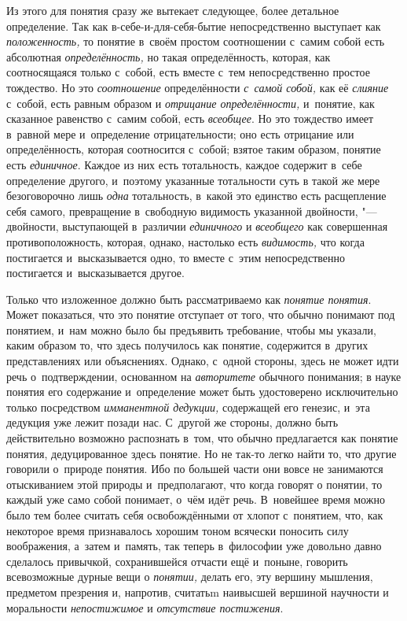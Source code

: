 Из этого для понятия сразу же вытекает следующее, более детальное
определение. Так как в-себе-и-для-себя-бытие непосредственно выступает как
{\em положенность,} то понятие в~своём простом соотношении с~самим собой есть
абсолютная {\em определённость,} но такая определённость, которая, как
соотносящаяся только с~собой, есть вместе с~тем непосредственно простое
тождество. Но это {\em соотношение} определённости {\em с~самой собой,} как
её {\em слияние} с~собой, есть равным образом и {\em отрицание определённости,}
и~понятие, как сказанное равенство с~самим собой, есть {\em всеобщее}.
Но это тождество имеет в~равной мере и~определение отрицательности; оно есть
отрицание или определённость, которая соотносится с~собой; взятое таким
образом, понятие есть {\em единичное}. Каждое из них есть тотальность, каждое
содержит в~себе определение другого, и~поэтому указанные тотальности суть в
такой же мере безоговорочно лишь {\em одна} тотальность, в~какой это
единство есть расщепление себя самого, превращение в~свободную видимость
указанной двойности, "--- двойности, выступающей в~различии {\em единичного}
и {\em всеобщего} как совершенная противоположность, которая, однако, настолько
есть {\em видимость,} что когда постигается и~высказывается одно, то вместе
с~этим непосредственно постигается и~высказывается другое.

Только что изложенное должно быть рассматриваемо как {\em понятие понятия}.
Может показаться, что это понятие отступает от того, что обычно понимают под
понятием, и~нам можно было бы предъявить требование, чтобы мы указали, каким
образом то, что здесь получилось как понятие, содержится в~других
представлениях или объяснениях. Однако, с~одной стороны, здесь не может идти
речь о~подтверждении, основанном на {\em авторитете} обычного понимания; в
науке понятия его содержание и~определение может быть удостоверено
исключительно только посредством {\em имманентной дедукции,} содержащей его
генезис, и~эта дедукция уже лежит позади нас. С~другой же стороны, должно
быть действительно возможно распознать в~том, что обычно предлагается как
понятие понятия, дедуцированное здесь понятие. Но не так-то легко найти то,
что другие говорили о~природе понятия. Ибо по большей части они вовсе не
занимаются отыскиванием этой природы и~предполагают, что когда говорят о
понятии, то каждый уже само собой понимает, о~чём идёт речь. В~новейшее
время можно было тем более считать себя освобождёнными от хлопот с~понятием,
что, как некоторое время признавалось хорошим тоном всячески поносить силу
воображения, а~затем и~память, так теперь в~философии уже довольно давно
сделалось привычкой, сохранившейся отчасти ещё и~поныне, говорить
всевозможные дурные вещи о {\em понятии,} делать его, эту вершину мышления,
предметом презрения и, напротив, считатьm наивысшей вершиной научности и
моральности {\em непостижимое} и {\em отсутствие постижения}.


